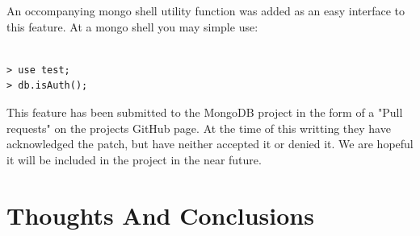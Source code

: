 \documentclass{../dependencies/acm_proc_article-sp}
\begin{document}
An occompanying mongo shell utility function was added as an easy
interface to this feature. At a mongo shell you may simple use:
\begin{lstlisting}

> use test;
> db.isAuth();
\end{lstlisting}

This feature has been submitted to the MongoDB project in the form
of a "Pull requests" on the projects GitHub page. \cite{4}
At the time of this writting they have acknowledged the patch, but have
neither accepted it or denied it. We are hopeful it will be included
in the project in the near future.

\section{Thoughts And Conclusions }

\newpage
%

%
%
\balancecolumns
\end{document}
